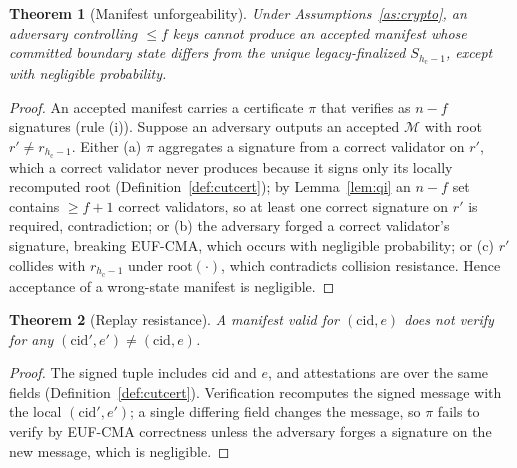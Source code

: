 \documentclass[journal]{IEEEtran}
\newtheorem{theorem}{Theorem}
\theoremstyle{remark}
\begin{document}
\begin{theorem}[Manifest unforgeability]
\label{th:unforge}
Under Assumptions~\ref{as:crypto}, an adversary controlling $\le f$ keys cannot produce an
accepted manifest whose committed boundary state differs from the unique legacy-finalized
$S_{h_{\mathrm{c}}-1}$, except with negligible probability.
\end{theorem}
\begin{proof}
An accepted manifest carries a certificate $\pi$ that verifies as $n-f$ signatures
(rule (i)). Suppose an adversary outputs an accepted $\mathcal{M}$ with root
$r'\ne r_{h_{\mathrm{c}}-1}$. Either (a) $\pi$ aggregates a signature from a correct validator on
$r'$, which a correct validator never produces because it signs only its locally recomputed root
(Definition~\ref{def:cutcert}); by Lemma~\ref{lem:qi} an $n-f$ set contains $\ge f+1$ correct
validators, so at least one correct signature on $r'$ is required, contradiction; or (b) the
adversary forged a correct validator's signature, breaking EUF-CMA, which occurs with negligible
probability; or (c) $r'$ collides with $r_{h_{\mathrm{c}}-1}$ under $\mathrm{root}(\cdot)$, which
contradicts collision resistance. Hence acceptance of a wrong-state manifest is negligible.
\end{proof}

\begin{theorem}[Replay resistance]
\label{th:replay}
A manifest valid for $(\mathrm{cid},e)$ does not verify for any $(\mathrm{cid}',e')\ne
(\mathrm{cid},e)$.
\end{theorem}
\begin{proof}
The signed tuple includes $\mathrm{cid}$ and $e$, and attestations are over the same fields
(Definition~\ref{def:cutcert}). Verification recomputes the signed message with the local
$(\mathrm{cid}',e')$; a single differing field changes the message, so $\pi$ fails to verify by
EUF-CMA correctness unless the adversary forges a signature on the new message, which is
negligible.
\end{proof}
\end{document}
